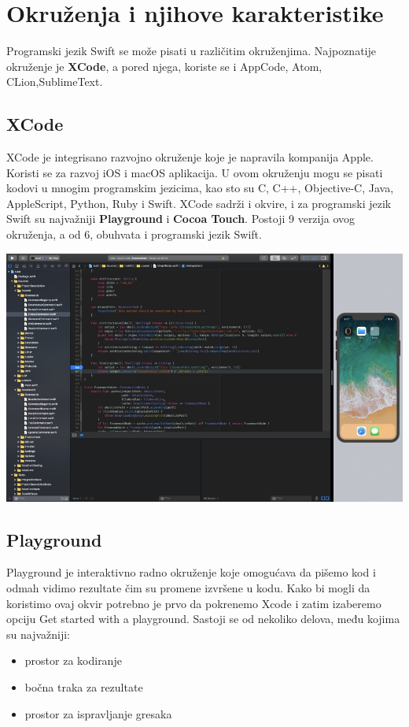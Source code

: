 \documentclass[a4paper]{article}
\begin{document}
\section{Okruženja i njihove karakteristike}	
\label{sec:cetvrtiDeo}

Programski jezik Swift se može pisati u različitim okruženjima. Najpoznatije okruženje je \textbf{XCode}, a pored njega, koriste se i AppCode, Atom, CLion,SublimeText.

\subsection{XCode}
\label{subsec:podnaslovXCode}



XCode je integrisano razvojno okruženje koje je napravila kompanija Apple. Koristi se za razvoj iOS i macOS aplikacija. U ovom okruženju mogu se pisati kodovi u mnogim programskim jezicima, kao sto su C, C++, Objective-C, Java, AppleScript, Python, Ruby i Swift. XCode sadrži i okvire, i za programski jezik Swift su najvažniji \textbf{Playground} i \textbf{Cocoa Touch}. 
Postoji 9 verzija ovog okruženja, a od 6, obuhvata i programski jezik Swift.
\vspace{3mm}


\includegraphics[scale=0.2]{xcode.jpg}


\subsection{Playground}
\label{subsec:podnaslovPlayground}
\vspace{3mm}


Playground je interaktivno radno okruženje koje omogućava da pišemo kod i odmah vidimo
rezultate čim su promene izvršene u kodu. Kako bi mogli da koristimo ovaj okvir potrebno je prvo
da pokrenemo Xcode i zatim izaberemo opciju Get started with a playground.
Sastoji se od nekoliko delova, među kojima su najvažniji: 
\begin{itemize}
\item prostor za kodiranje
\item bočna traka za rezultate
\item prostor za ispravljanje gresaka
\end{itemize}
\vspace{3mm}
\end{document}

